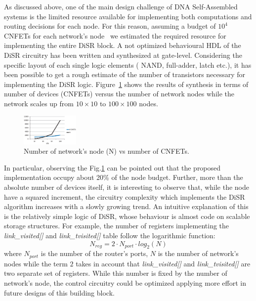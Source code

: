 As discussed above, one of the main design challenge of DNA
Self-Assembled systems is the limited resource available for
implementing both computations and routing decisions for each node.
For this reason, assuming a budget of $10^4$ CNFETs for each network's
node~\cite{liu_jetcs} we estimated the required resource for
implementing the entire DiSR block. A not optimized behavioural
HDL of the DiSR circuitry has been written and synthesized at gate-level.
Considering the specific layout of each single logic elements ( NAND,
full-adder, latch etc.), it has been possible to get a rough estimate
of the number of transistors necessary for implementing the DiSR
logic.  Figure~\ref{fig:imp_trend} shows the results of synthesis in
terms of number of devices (CNFETs) versus the number of network nodes
while the network scales up from $10\times10$ to $100\times100$ nodes.
\begin{figure}
  \centering
  \includegraphics[width=0.25\textwidth]{pictures/imp_rslt.eps}
  \caption{Number of network's node (N) vs number of CNFETs.}
 \label{fig:imp_trend}
\end{figure}
In particular, observing the Fig.\ref{fig:imp_trend} can 
be pointed out that the proposed implementation occupy  about 20\% of the node budget. 
Further, more than the absolute number of devices itself, it is interesting to
observe that, while the node have a squared increment, the circuitry
complexity which implements the DiSR algorithm increases with a slowly
growing trend.  
An intuitive explanation of this is the relatively simple logic of
DiSR, whose behaviour is almost code on scalable storage structures.
For example, the number of registers implementing the
\emph{link\_visited[]} and \emph{link\_tvisited[]} table follow the
logarithmic function:
\begin{equation}
  \label{eq:imp_trend}
  N_{reg}=2\cdot N_{port} \cdot log_2(N)
\end{equation}
where $N_{port}$ is the number of the router's ports, $N$ is the number 
of network's nodes while the term $2$ takes in account that \emph{link\_visited[]} and 
\emph{link\_tvisited[]} are two separate set of registers. While this number is fixed by 
the number of network's node, the control circuitry could be optimized applying more effort 
in future designs of this building block. 

